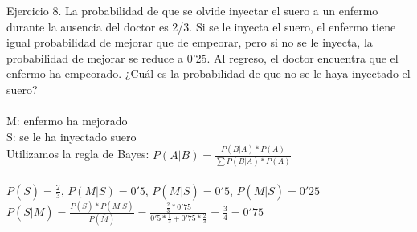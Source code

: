 \problem
Ejercicio 8. La probabilidad de que se olvide inyectar el suero a un enfermo durante la ausencia del doctor es 2/3. Si se le inyecta el suero, el enfermo tiene igual probabilidad de mejorar que de empeorar, pero si no se le inyecta, la probabilidad de mejorar se reduce a 0'25. Al regreso, el doctor encuentra que el enfermo ha empeorado. ¿Cuál es la probabilidad de que no se le haya inyectado el suero? \\ \\
M: enfermo ha mejorado \\
S: se le ha inyectado suero \\
Utilizamos la regla de Bayes: $P(A|B) = \frac{P(B|A)*P(A)}{\sum P(B|A)*P(A)}$ \\ \\
$P(\overline{S}) = \frac{2}{3}$, $P(M|S) = 0'5$, $P(\overline{M}|S) = 0'5$, $P(M|\overline{S}) = 0'25$ \\ 
$P(\overline{S}|\overline{M}) = \frac{P(\overline{S})*P(\overline{M}|\overline{S})}{P(\overline{M})} = \frac{\frac{2}{3}*0'75}{0'5*\frac{1}{3}+0'75*\frac{2}{3}}= \frac{3}{4} = 0'75$